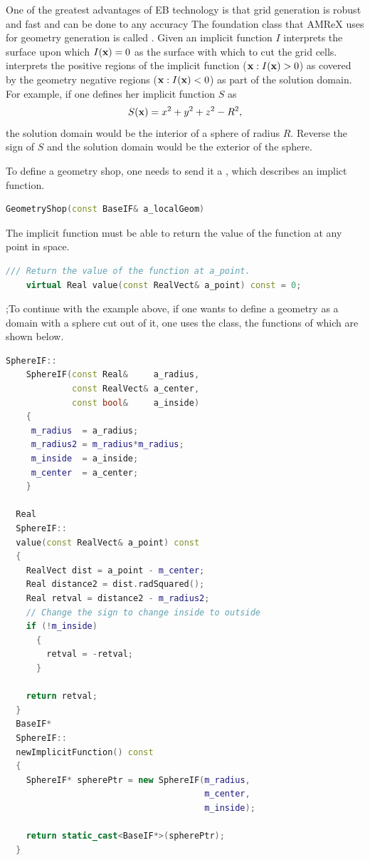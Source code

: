 One of the greatest advantages of EB technology is that grid
generation is robust and fast and can be done to any accuracy
The foundation class that AMReX uses for
geometry generation is called \geom.  Given an implicit
function $I$  \geom interprets the surface upon which $I({\bf x}) = 0$
as the surface with which to cut the grid cells.   \geom interprets
the positive regions of the implicit function (${\bf x}: I({\bf x}) > 0$)
as covered by the geometry  negative regions (${\bf x}: I({\bf x}) < 0$) 
as part of  the solution domain.  For example, if one defines her
implicit function $S$ as
$$
S({\bf x}) = x^2 + y^2 + z^2 - R^2,
$$
the solution domain would be the interior of a sphere of radius $R$.
Reverse the sign of $S$ and the solution domain would be the exterior
of the sphere.   

To define a geometry shop, one
needs to send it a \baseif, which describes an implict function. 

\begin{lstlisting}[language=cpp]
    GeometryShop(const BaseIF& a_localGeom)
\end{lstlisting}

The implicit function must be able to return the value of the function at any
point in space.

\begin{lstlisting}[language=cpp]
    /// Return the value of the function at a_point.  
    virtual Real value(const RealVect& a_point) const = 0;
\end{lstlisting}

;To continue with the example above, if one wants to define a geometry
as a domain with  a sphere cut out of it, one uses the \sphereif
class, the functions of which are shown below.

\begin{lstlisting}[language=cpp]
    SphereIF::
    SphereIF(const Real&     a_radius,
             const RealVect& a_center,
             const bool&     a_inside)
    {
     m_radius  = a_radius;
     m_radius2 = m_radius*m_radius;
     m_inside  = a_inside;
     m_center  = a_center;
    }

  Real
  SphereIF::
  value(const RealVect& a_point) const
  {
    RealVect dist = a_point - m_center;
    Real distance2 = dist.radSquared();
    Real retval = distance2 - m_radius2;
    // Change the sign to change inside to outside
    if (!m_inside)
      {
        retval = -retval;
      }

    return retval;
  }
  BaseIF* 
  SphereIF::
  newImplicitFunction() const
  {
    SphereIF* spherePtr = new SphereIF(m_radius,
                                       m_center,
                                       m_inside);

    return static_cast<BaseIF*>(spherePtr);
  }
\end{lstlisting}

